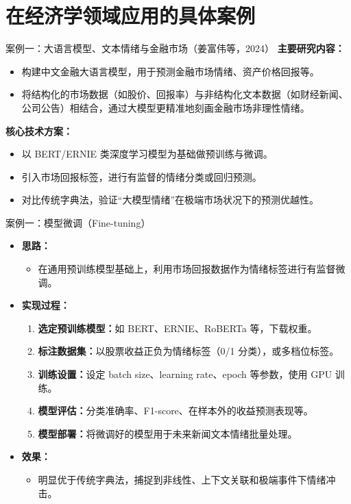 \documentclass{beamer}
\begin{document}
\section{在经济学领域应用的具体案例}
\begin{frame}{案例一：大语言模型、文本情绪与金融市场（姜富伟等，2024）}
    \textbf{主要研究内容：}
    \begin{itemize}
      \item 构建中文金融大语言模型，用于预测金融市场情绪、资产价格回报等。
      \item 将结构化的市场数据（如股价、回报率）与非结构化文本数据（如财经新闻、公司公告）相结合，通过大模型更精准地刻画金融市场非理性情绪。
    \end{itemize}
    
    \textbf{核心技术方案：}
    \begin{itemize}
      \item 以 BERT/ERNIE 类深度学习模型为基础做预训练与微调。
      \item 引入市场回报标签，进行有监督的情绪分类或回归预测。
      \item 对比传统字典法，验证“大模型情绪”在极端市场状况下的预测优越性。
    \end{itemize}
    \end{frame}
    
    \begin{frame}{案例一：模型微调（Fine-tuning）}
    \begin{itemize}
      \item \textbf{思路：} 
      \begin{itemize}
        \item 在通用预训练模型基础上，利用市场回报数据作为情绪标签进行有监督微调。
      \end{itemize}
      \item \textbf{实现过程：}
      \begin{enumerate}
        \item \textbf{选定预训练模型：}如 BERT、ERNIE、RoBERTa 等，下载权重。
        \item \textbf{标注数据集：}以股票收益正负为情绪标签（0/1 分类），或多档位标签。
        \item \textbf{训练设置：}设定 batch size、learning rate、epoch 等参数，使用 GPU 训练。
        \item \textbf{模型评估：}分类准确率、F1-score、在样本外的收益预测表现等。
        \item \textbf{模型部署：}将微调好的模型用于未来新闻文本情绪批量处理。
      \end{enumerate}
      \item \textbf{效果：}
      \begin{itemize}
        \item 明显优于传统字典法，捕捉到非线性、上下文关联和极端事件下情绪冲击。
      \end{itemize}
    \end{itemize}
    \end{frame}
    
\end{document}
